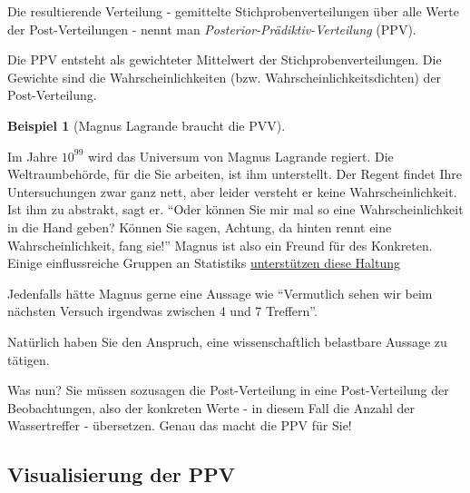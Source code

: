 \documentclass[
  a4paper,
  DIV=11]{scrreprt}
\theoremstyle{definition}
\newtheorem{example}{Beispiel}[chapter]
\theoremstyle{remark}
\begin{document}
Die resultierende Verteilung - gemittelte Stichprobenverteilungen über
alle Werte der Post-Verteilungen - nennt man
\emph{Posterior-Prädiktiv-Verteilung} (PPV).

\begin{tcolorbox}[enhanced jigsaw, title=\textcolor{quarto-callout-important-color}{\faExclamation}\hspace{0.5em}{Wichtig}, bottomtitle=1mm, bottomrule=.15mm, titlerule=0mm, colbacktitle=quarto-callout-important-color!10!white, colframe=quarto-callout-important-color-frame, leftrule=.75mm, left=2mm, toprule=.15mm, colback=white, arc=.35mm, breakable, toptitle=1mm, opacityback=0, rightrule=.15mm, coltitle=black, opacitybacktitle=0.6]

Die PPV entsteht als gewichteter Mittelwert der Stichprobenverteilungen.
Die Gewichte sind die Wahrscheinlichkeiten (bzw.
Wahrscheinlichkeitsdichten) der Post-Verteilung.

\end{tcolorbox}

\leavevmode{}%
\begin{example}[Magnus Lagrande braucht die PVV]\label{exm-wozu-ppv}

Im Jahre \(10^{99}\) wird das Universum von Magnus Lagrande regiert. Die
Weltraumbehörde, für die Sie arbeiten, ist ihm unterstellt. Der Regent
findet Ihre Untersuchungen zwar ganz nett, aber leider versteht er keine
Wahrscheinlichkeit. Ist ihm zu abstrakt, sagt er. ``Oder können Sie mir
mal so eine Wahrscheinlichkeit in die Hand geben? Können Sie sagen,
Achtung, da hinten rennt eine Wahrscheinlichkeit, fang sie!'' Magnus ist
also ein Freund für des Konkreten. Einige einflussreiche Gruppen an
Statistiks
\href{https://www.routledge.com/Predictive-Inference/Geisser/p/book/9780367449919}{unterstützen
diese Haltung}

Jedenfalls hätte Magnus gerne eine Aussage wie ``Vermutlich sehen wir
beim nächsten Versuch irgendwas zwischen 4 und 7 Treffern''.

Natürlich haben Sie den Anspruch, eine wissenschaftlich belastbare
Aussage zu tätigen.

Was nun? Sie müssen sozusagen die Post-Verteilung in eine
Post-Verteilung der Beobachtungen, also der konkreten Werte - in diesem
Fall die Anzahl der Wassertreffer - übersetzen. Genau das macht die PPV
für Sie!

\end{example}

\hypertarget{visualisierung-der-ppv}{%
\subsection{Visualisierung der PPV}\label{visualisierung-der-ppv}}
\end{document}
